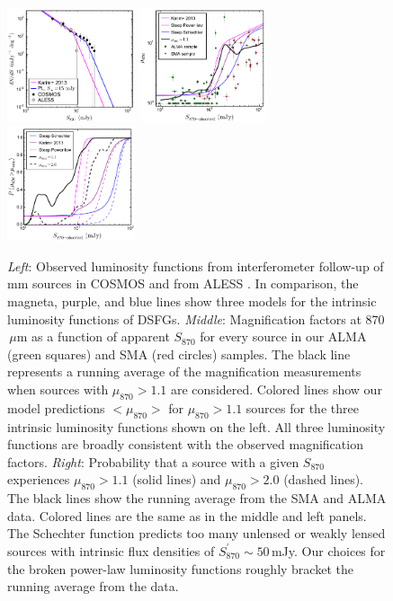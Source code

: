 \documentclass[iop]{emulateapj}
\begin{document}
\begin{figure}[!tbp] 
\includegraphics[width=0.335\textwidth]{../Figures/DifferentialNumberCounts.pdf}
\includegraphics[width=0.335\textwidth]{../Figures/s870_mu.pdf}
\includegraphics[width=0.335\textwidth]{../Figures/Pmu_S870.pdf}

\caption{ {\it Left}: Observed luminosity functions from interferometer
follow-up of mm sources in COSMOS \citep[black circles;][Miettinen et al., in
prep.]{Younger:2007fk, Younger:2009lr} and from ALESS \citep[pink
diamonds;][]{Karim:2013lr}.  In comparison, the magneta, purple, and blue lines
show three models for the intrinsic luminosity functions of DSFGs. {\it Middle}:
Magnification factors at 870$\,\mu$m as a function of apparent $S_{870}$ for
every source in our ALMA (green squares) and SMA (red circles) samples.  The
black line represents a running average of the magnification measurements when
sources with $\mu_{870} > 1.1$ are considered.  Colored lines show our model
predictions $<\mu_{870}>$ for $\mu_{870} > 1.1$ sources for the three intrinsic
luminosity functions shown on the left.  All three luminosity functions are
broadly consistent with the observed magnification factors.  {\it Right}:
Probability that a source with a given $S_{870}$ experiences $\mu_{870} > 1.1$
(solid lines) and $\mu_{870} > 2.0$ (dashed lines).  The black lines show the
running average from the SMA and ALMA data.  Colored lines are the same as in
the middle and left panels.  The Schechter function predicts too many unlensed
or weakly lensed sources with intrinsic flux densities of $S_{870}^\prime \sim
50\,$mJy.  Our choices for the broken power-law luminosity functions roughly
bracket the running average from the data.} \label{fig:lensstats}

\end{figure}
\end{document}
